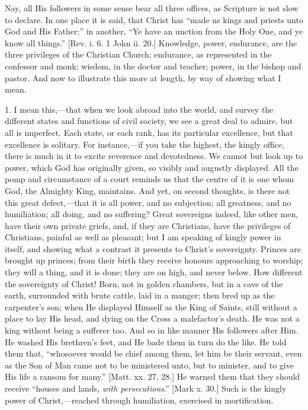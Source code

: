 Nay, all His followers in some sense bear all three offices, as
Scripture is not slow to declare. In one place it is said, that Christ
has ``made us kings and priests unto God and His Father;'' in
another, ``Ye have an unction from the Holy One, and ye know all
things.'' [Rev. i. 6. 1 John ii. 20.] Knowledge, power, endurance,
are the three privileges of the Christian Church; endurance, as
represented in the confessor and monk; wisdom, in the doctor and
teacher; power, in the bishop and pastor. And now to illustrate this
more at length, by way of showing what I mean.

1. I mean this,—that when we look abroad into the world, and
survey the different states and functions of civil society, we see a
great deal to admire, but all is imperfect. Each state, or each rank,
has its particular excellence, but that excellence is solitary. For
instance,—if you take the highest, the kingly office, there is much
in it to excite reverence and devotedness. We cannot but look up to
power, which God has originally given, so visibly and augustly
displayed. All the pomp and circumstance of a court reminds us that
the centre of it is one whom God, the Almighty King, maintains. And
yet, on second thoughts, is there not this great defect,—that it is
all power, and no subjection; all greatness, and no humiliation; all
doing, and no suffering? Great sovereigns indeed, like other men, have
their own private griefs, and, if they are Christians, have the
privileges of Christians, painful as well as pleasant; but I am
speaking of kingly power in itself, and showing what a contrast it
presents to Christ's sovereignty. Princes are brought up princes; from
their birth they receive honours approaching to worship; they will a
thing, and it is done; they are on high, and never below. How
different the sovereignty of Christ! Born, not in golden chambers, but
in a cave of the earth, surrounded with brute cattle, laid in a
manger; then bred up as the carpenter's son; when He displayed Himself
as the King of Saints, still without a place to lay His head, and
dying on the Cross a malefactor's death. He was not a king without
being a sufferer too. And so in like manner His followers after Him.
He washed His brethren's feet, and He bade them in turn do the like.
He told them that, ``whosoever would be chief among them, let him
be their servant, even as the Son of Man came not to be ministered
unto, but to minister, and to give His life a ransom for many.''
[Matt. xx. 27, 28.] He warned them that they should receive
``houses and lands, \emph{with persecutions}.'' [Mark x. 30.]
Such is the kingly power of Christ,—reached through humiliation,
exercised in mortification.

